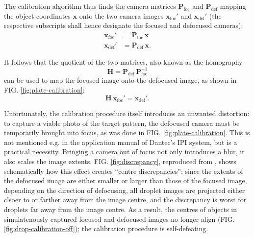 \documentclass[floatfix,aip,rsi,reprint,graphicx]{revtex4-1}
\begin{document}
The calibration algorithm thus finds the camera matrices
$\mathbf{P}_\text{foc}$ and $\mathbf{P}_\text{def}$ mapping the
object coordinates $\mathbf{x}$ onto the two camera images
$\mathbf{x}_\text{foc}'$ and $\mathbf{x}_\text{def}'$ (the respective 
    subscripts shall hence designate the focused and defocused
    cameras):
\begin{align}
    \mathbf{x}_\text{foc}' &= \mathbf{P}_\text{foc} \, \mathbf{x} \\
    \mathbf{x}_\text{def}' &= \mathbf{P}_\text{def} \, \mathbf{x}.
\end{align}

It follows that the quotient of the two matrices, also known as the homography
\begin{equation}
    \mathbf{H} = \mathbf{P}_\text{def} \, \mathbf{P}_\text{foc}^{-1}
\end{equation}
can be used to map the focused image onto the defocused image, as shown in FIG.
\ref{fig:plate-calibration}:
\begin{equation}
    \mathbf{H}\, \mathbf{x}_\text{foc}' = \mathbf{x}_\text{def}'.
    \label{homography-definition}
\end{equation}

Unfortunately, the calibration procedure itself introduces an unwanted
distortion: to capture a viable photo of the target pattern, the defocused
camera must be temporarily brought into focus, as was done in
FIG. \ref{fig:plate-calibration}. This is not mentioned e.g. in the
application manual of Dantec's IPI system, but is a practical necessity.
Bringing a camera out of focus not only introduces a blur, it also scales the
image extents. FIG. \ref{fig:discrepancy}, reproduced from \citet{Hardalupas10},
shows schematically how this effect creates ``centre discrepancies'': since the
extents of the defocused image are either smaller or larger than those of the
focused image, depending on the direction of defocusing, all droplet images are
projected either clsoer to or farther away from the image centre, and the
discrepancy is worst for droplets far away from the image centre. As a result,
the centres of objects in simulatenously captured focused and defocused images
no longer align (FIG. \ref{fig:drop-calibration-off}); the calibration procedure is self-defeating.
\end{document}
